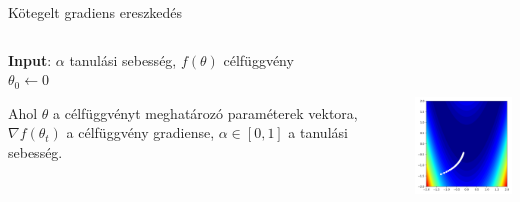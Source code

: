 \documentclass[english, aspectratio=169]{beamer}
\begin{document}
\begin{frame}{Kötegelt gradiens ereszkedés}
	\begin{columns}
		\begin{column}{.7\textwidth}
			\begin{algorithm}[H]
				\caption{Kötegelt gradiens ereszkedés}
				\SetAlgoLined
				\textbf{Input}: $\alpha$ tanulási sebesség, $f(\theta)$ célfüggvény\\
				$\theta_0 \leftarrow 0$ 
			\end{algorithm}
			Ahol $\theta$ a célfüggvényt meghatározó paraméterek vektora, $\nabla f(\theta_t)$ a célfüggvény gradiense, $\alpha \in [0,1]$ a tanulási sebesség.
		\end{column}
		\begin{column}{.3\textwidth}
			\begin{center}
				\includegraphics[height=5cm, width=5cm, keepaspectratio]{images/gd_batch.png}
			\end{center}
		\end{column}
	\end{columns}
\end{frame}
\end{document}
